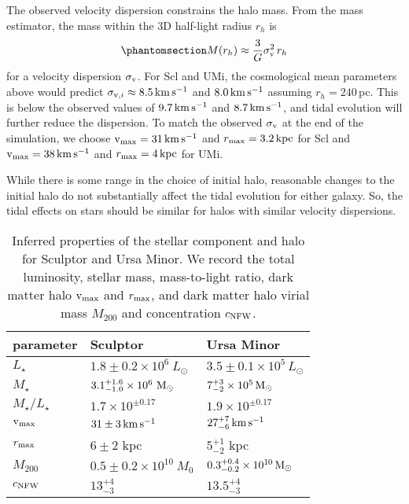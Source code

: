The observed velocity dispersion constrains the halo mass. From the
\citet{wolf+2010} mass estimator, the mass within the 3D half-light
radius \(r_h\) is
\begin{equation}\protect\phantomsection\label{eq:wolf_mass}{
M(r_h) \approx \frac{3}{G} \sigma_\V^2\,r_h
}\end{equation} for a velocity dispersion \(\sigma_{\rm v}\). For Scl and
UMi, the cosmological mean parameters above would predict
\(\sigma_{{\rm v}, i}  \approx 8.5\,{\rm km\,s^{-1}}\) and \(8.0\,{\rm km\,s^{-1}}\) assuming
\(r_h=240\,\)pc. This is below the observed values of \(9.7\,{\rm km\,s^{-1}}\) and
\(8.7\,{\rm km\,s^{-1}}\), and tidal evolution will further reduce the dispersion.
To match the observed \(\sigma_{\rm v}\) at the end of the simulation, we
choose \({\rm v}_{\rm max} = 31\,{\rm km\,s^{-1}}\) and \(r_{\rm max}=3.2\,{\rm kpc}\) for Scl and
\({\rm v}_{\rm max}=38\,{\rm km\,s^{-1}}\) and \(r_{\rm max}=4\,{\rm kpc}\) for UMi.

While there is some range in the choice of initial halo, reasonable
changes to the initial halo do not substantially affect the tidal
evolution for either galaxy. So, the tidal effects on stars should be
similar for halos with similar velocity dispersions.

\begin{table*}[t]
\centering
\caption[Derived Properties of Sculptor and Ursa Minor]{Inferred properties of the stellar component and halo for Sculptor and Ursa Minor. We record the total luminosity, stellar mass, mass-to-light ratio, dark matter halo ${\rm v}_{\rm max}$ and $r_{\rm max}$, and dark matter halo virial mass $M_{200}$ and concentration $c_{\rm NFW}$. }
\label{tbl:derived_props}
\begin{tabular}{lll}
\toprule
parameter & Sculptor & Ursa Minor\\
\midrule
$L_\star$ & $1.8\pm0.2\times10^6\ L_\odot$ & $3.5 \pm 0.1 \times 10^5\,L_\odot$\\
$M_\star$ & $3.1_{-1.0}^{+1.6} \times10^6\ {\rm M}_\odot$ & $7_{-2}^{+3} \times 10^5\,{\rm M}_{\odot}$\\
$M_\star / L_\star$ & $1.7\times 10^{\pm 0.17}$ & $1.9 \times 10^{\pm 0.17}$\\
${\rm v}_{\rm max}$ & $31\pm 3\,{\rm km\,s^{-1}}$ & $27_{-6}^{+7}\,{\rm km\,s^{-1}}$\\
$r_{\rm max}$ & $6 \pm 2$ kpc & $5_{-2}^{+1}$ kpc\\
$M_{200}$ & $0.5 \pm 0.2\times10^{10}\ M_0$ & $0.3_{-0.2}^{+0.4} \times 10^{10}\,{\rm M}_{\odot}$\\
$c_{\rm NFW}$ & $13_{-3}^{+4}$ & $13.5_{-3}^{+4}$\\
\bottomrule
\end{tabular}
\end{table*}

